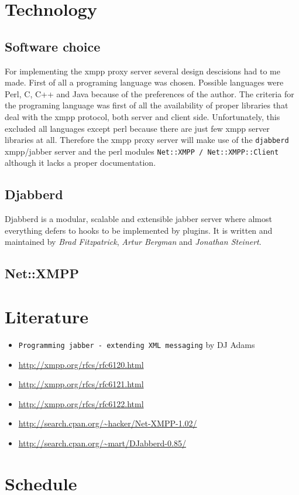 \documentclass[a4paper,10pt,numbers=noendperiod]{scrartcl}
\begin{document}
\section{Technology}
\subsection{Software choice}
For implementing the xmpp proxy server several design descisions had to me made. First of all a programing language was chosen. Possible languages were Perl, C, C++ and Java because of the preferences of the author. The criteria for the programing language was first of all the availability of proper libraries that deal with the xmpp protocol, both server and client side.  Unfortunately, this excluded all languages except perl because there are just few xmpp server libraries at all. Therefore the xmpp proxy server will make use of the \texttt{djabberd} xmpp/jabber server and the perl modules \texttt{Net::XMPP / Net::XMPP::Client} although it lacks a proper documentation.
\subsection{Djabberd}
Djabberd is a modular, scalable and extensible jabber server where almost everything defers to hooks to be implemented by plugins. %
It is written and maintained by \textit{Brad Fitzpatrick}, \textit{Artur Bergman} and \textit{Jonathan Steinert}.

\subsection{Net::XMPP}

\section{Literature}
\begin{itemize}
	\item \texttt{Programming jabber - extending XML messaging} by DJ Adams\\
	\item \url{http://xmpp.org/rfcs/rfc6120.html}\\
	\item \url{http://xmpp.org/rfcs/rfc6121.html}\\
	\item \url{http://xmpp.org/rfcs/rfc6122.html}\\
	\item \url{http://search.cpan.org/~hacker/Net-XMPP-1.02/}\\
	\item \url{http://search.cpan.org/~mart/DJabberd-0.85/}\\
\end{itemize}


\section{Schedule}
\end{document}
